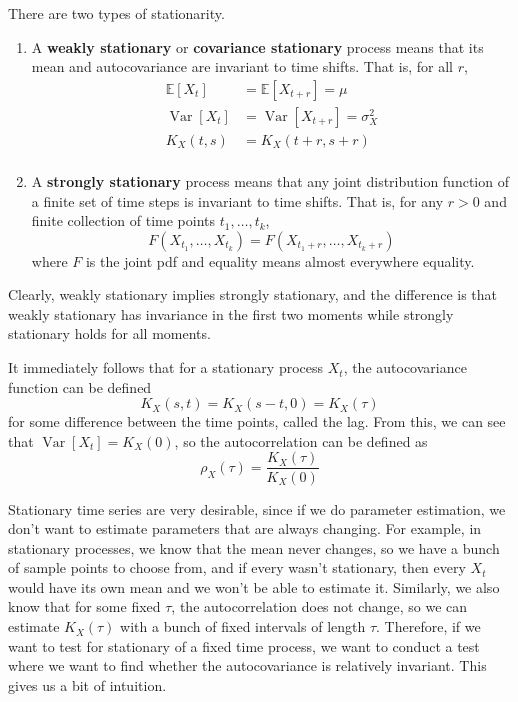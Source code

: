 \documentclass{article}
\DeclareMathOperator{\Var}{Var}
\begin{document}
    \begin{definition}[Stationarity]
      There are two types of stationarity. 
      \begin{enumerate}
        \item A \textbf{weakly stationary} or \textbf{covariance stationary} process means that its mean and autocovariance are invariant to time shifts. That is, for all $r$, 
          \begin{align}
            \mathbb{E}[X_t] & = \mathbb{E}[X_{t+r}] = \mu \\
            \Var[X_t] & = \Var[X_{t+r}] = \sigma_X^2 \\
            K_X (t, s) & = K_X (t + r, s + r) \\
          \end{align}

        \item A \textbf{strongly stationary} process means that any joint distribution function of a finite set of time steps is invariant to time shifts. That is, for any $r > 0$ and  finite collection of time points $t_1, \ldots, t_k$, 
          \begin{equation}
            F(X_{t_1}, \ldots, X_{t_k}) = F(X_{t_1 + r}, \ldots, X_{t_k + r})
          \end{equation}
          where $F$ is the joint pdf and equality means almost everywhere equality. 
      \end{enumerate}
      Clearly, weakly stationary implies strongly stationary, and the difference is that weakly stationary has invariance in the first two moments while strongly stationary holds for all moments. 
    \end{definition}

    \begin{theorem}
      It immediately follows that for a stationary process $X_t$, the autocovariance function can be defined 
      \begin{equation}
        K_X (s, t) = K_X(s - t, 0) = K_X (\tau)
      \end{equation}
      for some difference between the time points, called the lag. From this, we can see that $\Var[X_t] = K_X (0)$, so the autocorrelation can be defined as 
      \begin{equation}
        \rho_X(\tau) = \frac{K_X (\tau)}{K_X (0)}
      \end{equation}
    \end{theorem}

    Stationary time series are very desirable, since if we do parameter estimation, we don't want to estimate parameters that are always changing. For example, in stationary processes, we know that the mean never changes, so we have a bunch of sample points to choose from, and if every wasn't stationary, then every $X_t$ would have its own mean and we won't be able to estimate it. Similarly, we also know that for some fixed $\tau$, the autocorrelation does not change, so we can estimate $K_X (\tau)$ with a bunch of fixed intervals of length $\tau$. Therefore, if we want to test for stationary of a fixed time process, we want to conduct a test where we want to find whether the autocovariance is relatively invariant. This gives us a bit of intuition. 
\end{document}
